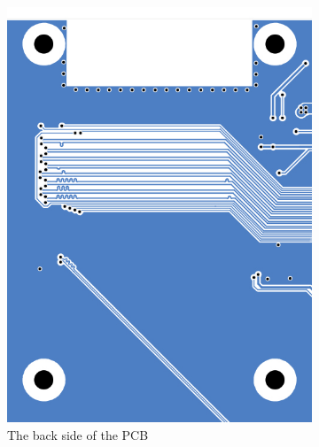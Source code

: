 \begin{figure}[b!]
\begin{subfigure}{.33\textwidth}
    \includegraphics[width=.95\linewidth]{Figures/kicad/close-ups/cm4-back}
    \caption{The back side of the PCB}
    \label{fig:CM4CircuitBack}
  \end{subfigure}%
  \begin{subfigure}{.33\textwidth}
    \centering

\end{subfigure}
\end{figure}
